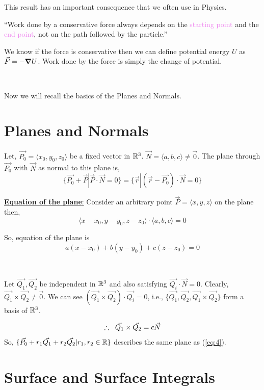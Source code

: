 \documentclass[../Analysis-3]{subfiles}
\begin{document}
This result has an important consequence that we often use in Physics.

``Work done by a conservative force always depends on the \textcolor{violet}{starting point} and the \textcolor{violet}{end point}, not on the path followed by the particle.''
\vspace*{0.2cm}

We know if the force is conservative then we can define potential energy $U$ as $ \vec{F} = -\grad U$. Work done by the force is simply the change of potential.

\

Now we will recall the basics of the Planes and Normals.


\section{Planes and Normals}
Let, $\vec{P_0} = \langle x_0,y_0,z_0 \rangle$ be a fixed vector in $\mathbb{R}^3$. $\vec{N} = \langle a,b,c \rangle \neq \vec{0}$. The plane through $\vec{P_0}$ with $\vec{N}$ as normal to this plane is,
\[ \{\vec{P_0} + \vec{P} | \vec{P}\cdot \vec{N} = 0\} = \{\vec{r} | (\vec{r}-\vec{P_0})\cdot \vec{N} = 0 \} \]

\underline{\textbf{Equation of the plane}:} Consider an arbitrary point $\vec{P} = \langle x,y,z\rangle$ on the plane then, $$\langle x-x_0,y-y_0,z-z_0\rangle \cdot \langle a,b,c \rangle = 0$$

So, equation of the plane is
\begin{equation}
    a(x-x_0)+b(y-y_0) +c(z-z_0)= 0 \label{eq:4}
\end{equation}

\

Let $\vec{Q_1},\vec{Q_2}$ be independent in $\mathbb{R}^3$ and also satisfying $\vec{Q_i} \cdot \vec{N} = 0$. Clearly, $\vec{Q_1}\times \vec{Q_2} \neq \vec{0}$. We can see $(\vec{Q_1}\times \vec{Q_2}) \cdot \vec{Q_i} = 0$, i.e., $\{\vec{Q_1},\vec{Q_2},\vec{Q_1}\times \vec{Q_2}\}$ form a basis of $\mathbb{R}^3$.

$$\therefore \hspace{0.2cm}\vec{Q_1}\times \vec{Q_2} = c \vec{N}$$
So, $\{\vec{P_0} + r_1 \vec{Q_1} + r_2 \vec{Q_2} | r_1,r_2 \in \mathbb{R} \}$ describes the same plane as (\ref{eq:4}).

\section{Surface and Surface Integrals}
\end{document}
